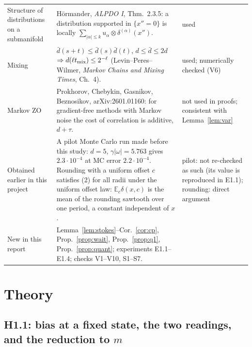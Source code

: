 \documentclass[11pt,a4paper]{article}
\numberwithin{equation}{section}
\theoremstyle{definition}
\theoremstyle{remark}
\newcommand{\E}{\mathbb E}\newcommand{\R}{\mathbb R}\newcommand{\N}{\mathbb N}\newcommand{\Prob}{\mathbb P}
\begin{document}
\begin{center}
\begin{tabularx}{\textwidth}{@{}p{3.3cm}Xp{2.6cm}@{}}
Structure of distributions on a submanifold & Hörmander, \emph{ALPDO I}, Thm.~2.3.5: a distribution supported in $\{x''=0\}$ is locally $\sum_{|\alpha|\le k}u_\alpha\otimes\delta^{(\alpha)}(x'')$. & used \\
Mixing & $\bar d(s+t)\le\bar d(s)\bar d(t)$, $d\le\bar d\le2d$ $\Rightarrow d(\ell t_{\rm mix})\le2^{-\ell}$ (Levin--Peres--Wilmer, \emph{Markov Chains and Mixing Times}, Ch.~4). & used; numerically checked (V6) \\
Markov ZO & Prokhorov, Chebykin, Gasnikov, Beznosikov, arXiv:2601.01160: for gradient-free methods with Markov noise the cost of correlation is additive, $d+\tau$. & not used in proofs; consistent with Lemma~\ref{lem:var} \\
\midrule
Obtained earlier in this project & A pilot Monte Carlo run made before this study: $d=5$, $\gamma|\omega|=5.763$ gives $2.3\cdot10^{-4}$ at MC error $2.2\cdot10^{-4}$. Rounding with a uniform offset $c$ satisfies (2) for all radii under the uniform offset law: $\E_c\delta(x,c)$ is the mean of the rounding sawtooth over one period, a constant independent of $x$. & pilot: not re-checked as such (its value is reproduced in E1.1); rounding: direct argument \\
\midrule
New in this report & Lemma~\ref{lem:stokes}--Cor.~\ref{cor:cp}, Prop.~\ref{prop:wait}, Prop.~\ref{prop:q1}, Prop.~\ref{prop:quant}; experiments E1.1--E1.4; checks V1--V10, S1--S7. & \\
\bottomrule
\end{tabularx}
\end{center}

\section{Theory}\label{sec:theory}
\subsection{H1.1: bias at a fixed state, the two readings, and the reduction to $m$}
\end{document}
